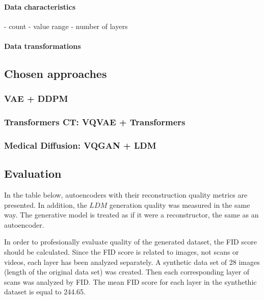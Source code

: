 \paragraph{Data characteristics}
- count
- value range
- number of layers
\paragraph{Data transformations}

\newpage
\subsection{Chosen approaches}
\subsubsection{VAE + DDPM}


\newpage
\subsubsection{Transformers CT: VQVAE + Transformers}

\newpage
\subsubsection{Medical Diffusion: VQGAN + LDM}


\subsection{Evaluation}

In the table below, autoencoders with their reconstruction quality metrics are presented. 
In addition, the $LDM$ generation quality was measured in the same way. The generative model is treated as if it were a reconstructor, the same as an autoencoder.

In order to profesionally evaluate quality of the generated dataset, the FID score should be calculated. Since the FID score is related to images, not scans or videos, each layer has been analyzed separately. 
A synthetic data set of 28 images (length of the original data set) was created. Then each corresponding layer of scans was analyzed by FID. The mean FID score for each layer in the synthethic dataset is equal to 244.65. 

